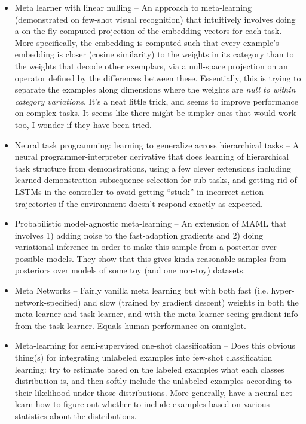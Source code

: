 \documentclass[11pt]{article}
\begin{document}
\begin{itemize}
\item Meta learner with linear nulling -- An approach to meta-learning (demonstrated on few-shot visual recognition) that intuitively involves doing a on-the-fly computed projection of the embedding vectors for each task. More specifically, the embedding is computed such that every example's embedding is closer (cosine similarity) to the weights in its category than to the weights that decode other exemplars, via a null-space projection on an operator defined by the differences between these. Essentially, this is trying to separate the examples along dimensions where the weights are \emph{null to within category variations}. It's a neat little trick, and seems to improve performance on complex tasks. It seems like there might be simpler ones that would work too, I wonder if they have been tried. \citep{Yoon2018}
\item Neural task programming: learning to generalize across hierarchical tasks -- A neural programmer-interpreter derivative that does learning of hierarchical task structure from demonstrations, using a few clever extensions including learned demonstration subsequence selection for sub-tasks, and getting rid of LSTMs in the controller to avoid getting ``stuck'' in incorrect action trajectories if the environment doesn't respond exactly as expected.
\item Probabilistic model-agnostic meta-learning -- An extension of MAML that involves 1) adding noise to the fast-adaption gradients and 2) doing variational inference in order to make this sample from a posterior over possible models. They show that this gives kinda reasonable samples from posteriors over models of some toy (and one non-toy) datasets.  
\item Meta Networks -- Fairly vanilla meta learning but with both fast (i.e. hyper-network-specified) and slow (trained by gradient descent) weights in both the meta learner and task learner, and with the meta learner seeing gradient info from the task learner. Equals human performance on omniglot.
\item Meta-learning for semi-supervised one-shot classification -- Does this obvious thing(s) for integrating unlabeled examples into few-shot classification learning: try to estimate based on the labeled examples what each classes distribution is, and then softly include the unlabeled examples according to their likelihood under those distributions. More generally, have a neural net learn how to figure out whether to include examples based on various statistics about the distributions.

\end{itemize}
\end{document}
